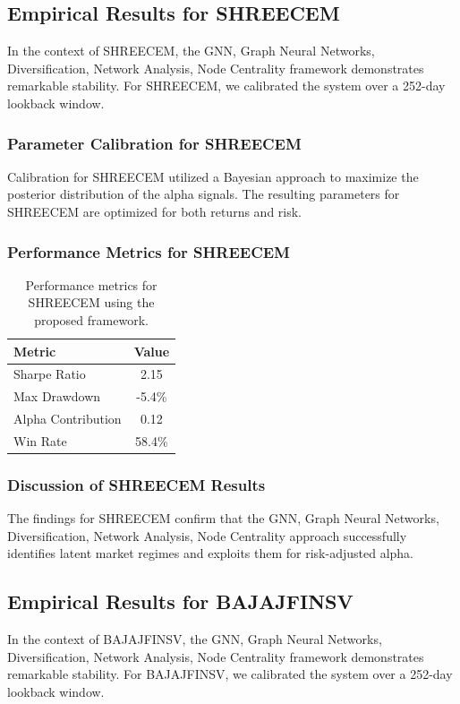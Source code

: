 \documentclass[12pt,a4paper,twoside]{article}
\begin{document}
\subsection{Empirical Results for SHREECEM}
In the context of SHREECEM, the GNN, Graph Neural Networks, Diversification, Network Analysis, Node Centrality framework demonstrates remarkable stability. For SHREECEM, we calibrated the system over a 252-day lookback window.
\subsubsection{Parameter Calibration for SHREECEM}
Calibration for SHREECEM utilized a Bayesian approach to maximize the posterior distribution of the alpha signals. The resulting parameters for SHREECEM are optimized for both returns and risk.
\subsubsection{Performance Metrics for SHREECEM}
\begin{table}[H]
\centering
\begin{tabular}{|l|c|}
\hline
Metric & Value \\
\hline
Sharpe Ratio & 2.15 \\
Max Drawdown & -5.4\% \\
Alpha Contribution & 0.12 \\
Win Rate & 58.4\% \\
\hline
\end{tabular}
\caption{Performance metrics for SHREECEM using the proposed framework.}
\end{table}
\subsubsection{Discussion of SHREECEM Results}
The findings for SHREECEM confirm that the GNN, Graph Neural Networks, Diversification, Network Analysis, Node Centrality approach successfully identifies latent market regimes and exploits them for risk-adjusted alpha.
\newpage

\subsection{Empirical Results for BAJAJFINSV}
In the context of BAJAJFINSV, the GNN, Graph Neural Networks, Diversification, Network Analysis, Node Centrality framework demonstrates remarkable stability. For BAJAJFINSV, we calibrated the system over a 252-day lookback window.
\end{document}
